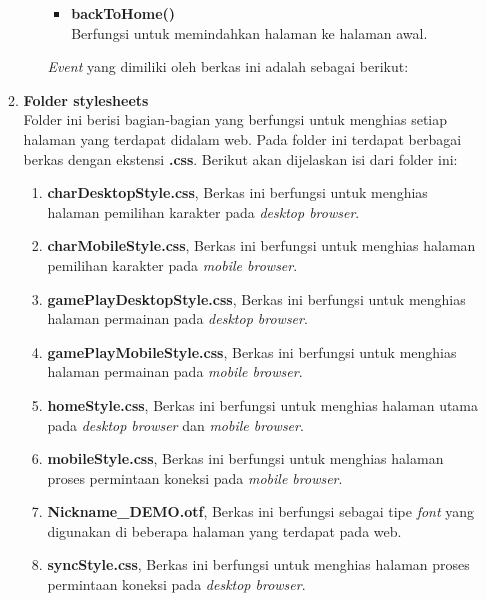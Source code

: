 \begin{enumerate}
\begin{enumerate}
\begin{enumerate}
\begin{itemize}
				\item \textbf{backToHome()} \\
				Berfungsi untuk memindahkan halaman ke halaman awal.
			\end{itemize}
			
			\textit{Event} yang dimiliki oleh berkas ini adalah sebagai berikut:
			
		\end{enumerate}
		\item \textbf{Folder stylesheets} \\ 
		Folder ini berisi bagian-bagian yang berfungsi untuk menghias setiap halaman yang terdapat didalam web. Pada folder ini terdapat berbagai berkas dengan ekstensi \textbf{.css}. Berikut akan dijelaskan isi dari folder ini:
		
		\begin{enumerate}
			\item \textbf{charDesktopStyle.css}, Berkas ini berfungsi untuk menghias halaman pemilihan karakter pada \textit{desktop browser}.
			
			\item \textbf{charMobileStyle.css}, Berkas ini berfungsi untuk menghias halaman pemilihan karakter pada \textit{mobile browser}.
			
			\item \textbf{gamePlayDesktopStyle.css}, Berkas ini berfungsi untuk menghias halaman permainan pada \textit{desktop browser}.
			
			\item \textbf{gamePlayMobileStyle.css}, Berkas ini berfungsi untuk menghias halaman permainan pada \textit{mobile browser}.
			
			\item \textbf{homeStyle.css}, Berkas ini berfungsi untuk menghias halaman utama pada \textit{desktop browser} dan \textit{mobile browser}.
			
			\item \textbf{mobileStyle.css}, Berkas ini berfungsi untuk menghias halaman proses permintaan koneksi pada \textit{mobile browser}.
			
			\item \textbf{Nickname\_DEMO.otf}, Berkas ini berfungsi sebagai tipe \textit{font} yang digunakan di beberapa halaman yang terdapat pada web.
			
			\item \textbf{syncStyle.css}, Berkas ini berfungsi untuk menghias halaman proses permintaan koneksi pada \textit{desktop browser}.
			

\end{enumerate}
\end{enumerate}
\end{enumerate}
